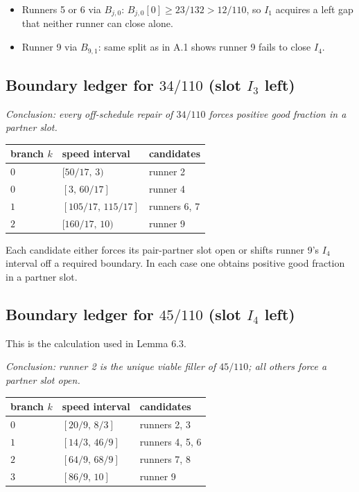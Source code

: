 \documentclass[12pt]{article}
\begin{document}
\begin{itemize}
\item Runners 5 or 6 via $B_{j,0}$: $B_{j,0}[0]\ge 23/132>12/110$, so $I_1$ acquires a
  left gap that neither runner can close alone.
\item Runner 9 via $B_{9,1}$: same split as in A.1 shows runner 9 fails to close $I_4$.
\end{itemize}

\subsection{Boundary ledger for $34/110$ (slot $I_3$ left)}

\emph{Conclusion: every off-schedule repair of $34/110$ forces positive good fraction in a
partner slot.}

\begin{center}
\begin{tabular}{@{}lll@{}}
\toprule
branch $k$ & speed interval & candidates \\
\midrule
$0$ & $[50/17,\,3)$ & runner 2 \\
$0$ & $[3,\,60/17]$ & runner 4 \\
$1$ & $[105/17,\,115/17]$ & runners 6, 7 \\
$2$ & $[160/17,\,10)$ & runner 9 \\
\bottomrule
\end{tabular}
\end{center}

Each candidate either forces its pair-partner slot open or shifts runner 9's $I_4$ interval
off a required boundary. In each case one obtains positive good fraction in a partner slot.

\subsection{Boundary ledger for $45/110$ (slot $I_4$ left)}

This is the calculation used in Lemma 6.3.

\emph{Conclusion: runner 2 is the unique viable filler of $45/110$; all others force a partner
slot open.}

\begin{center}
\begin{tabular}{@{}lll@{}}
\toprule
branch $k$ & speed interval & candidates \\
\midrule
$0$ & $[20/9,\,8/3]$ & runners 2, 3 \\
$1$ & $[14/3,\,46/9]$ & runners 4, 5, 6 \\
$2$ & $[64/9,\,68/9]$ & runners 7, 8 \\
$3$ & $[86/9,\,10]$ & runner 9 \\
\bottomrule
\end{tabular}
\end{center}
\end{document}
